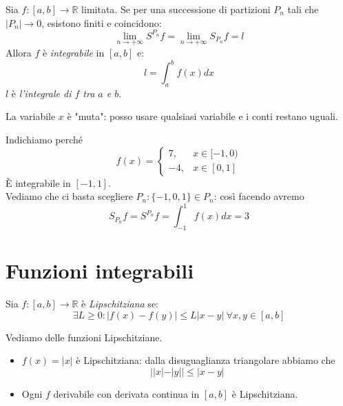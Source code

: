 \begin{definizione}[]
    Sia $f:[a,b]\to \mathbb{R}$ limitata. Se per una successione di partizioni $P_n$ tali che $|P_n|\to 0$, esistono finiti e coincidono:
    \begin{equation}
        \lim_{n\to+\infty}S^{P_n}f=\lim_{n\to+\infty}S_{P_n}f=l
    \end{equation}
    Allora $f$ è \textit{integrabile} in $[a,b]$ e:
    \begin{equation}
        l= \int_{a}^{b}f(x)dx
    \end{equation}
    $l$ è \textit{l'integrale di $f$ tra $a$ e $b$}.
\end{definizione}

\begin{osservazione}[]
    La variabile $x$ è "muta": posso usare qualsiasi variabile e i conti restano uguali.
\end{osservazione}

\begin{esempio}[]
    Indichiamo perché
    \begin{equation}
        f(x)=\begin{cases}
            7, & x\in[-1,0)\\
           -4,& x\in[0,1]
        \end{cases}
    \end{equation}
    È integrabile in $[-1,1]$. \\
    Vediamo che ci basta scegliere $P_n:\{-1,0,1\}\in P_n$: così facendo avremo
    \begin{equation}
        S_{P_n}f=S^{P_n}f=\int_{-1}^{1}f(x)dx=3
    \end{equation}
\end{esempio}


\section{Funzioni integrabili}\label{sec:funzioni_integrabili}

\begin{definizione}[]
    Sia $f:[a,b]\to \mathbb{R}$ è \textit{Lipschitziana} se:
    \begin{equation}
        \exists L\geq 0: |f(x)-f(y)|\leq L|x-y|\ \forall x,y\in [a,b]
    \end{equation}
\end{definizione}

\begin{esempio}[]
    Vediamo delle funzioni Lipschitziane. \\
    \begin{itemize}
        \item $f(x)=|x|$ è Lipschitziana: dalla disuguaglianza triangolare abbiamo che
            \begin{equation}
                ||x|-|y||\leq|x-y|
            \end{equation}
        \item Ogni $f$ derivabile con derivata continua in $[a,b]$ è Lipschitziana.
    \end{itemize}
\end{esempio}

